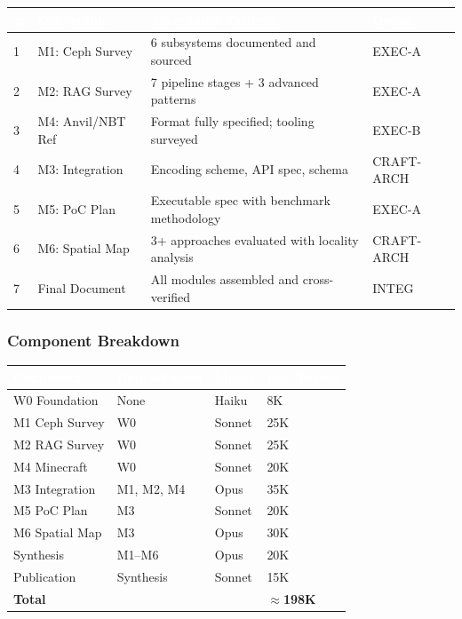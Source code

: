 \documentclass[11pt,letterpaper]{article}
\newcommand{\tableheader}[1]{\textbf{\sffamily\textcolor{white}{#1}}}
\begin{document}
\begin{center}
\begin{tabularx}{\textwidth}{C{0.5cm}L{3cm}L{4cm}X}
\toprule
{}
\tableheader{\#} & \tableheader{Deliverable} & \tableheader{Acceptance Criteria} & \tableheader{Owner} \\
 & M1: Ceph Survey & 6 subsystems documented and sourced & EXEC-A \\
2 & M2: RAG Survey & 7 pipeline stages + 3 advanced patterns & EXEC-A \\
3 & M4: Anvil/NBT Ref & Format fully specified; tooling surveyed & EXEC-B \\
4 & M3: Integration & Encoding scheme, API spec, schema & CRAFT-ARCH \\
5 & M5: PoC Plan & Executable spec with benchmark methodology & EXEC-A \\
6 & M6: Spatial Map & 3+ approaches evaluated with locality analysis & CRAFT-ARCH \\
7 & Final Document & All modules assembled and cross-verified & INTEG \\
\bottomrule
\end{tabularx}
\end{center}

\subsubsection{Component Breakdown}

\begin{center}
\begin{tabularx}{\textwidth}{L{2.5cm}L{3cm}L{2cm}C{2cm}}
\toprule
{}
\tableheader{Component} & \tableheader{Dependencies} & \tableheader{Model} & \tableheader{Est. Tokens} \\
\midrule
W0 Foundation & None & Haiku & 8K \\
M1 Ceph Survey & W0 & Sonnet & 25K \\
M2 RAG Survey & W0 & Sonnet & 25K \\
M4 Minecraft & W0 & Sonnet & 20K \\
M3 Integration & M1, M2, M4 & Opus & 35K \\
M5 PoC Plan & M3 & Sonnet & 20K \\
M6 Spatial Map & M3 & Opus & 30K \\
Synthesis & M1--M6 & Opus & 20K \\
Publication & Synthesis & Sonnet & 15K \\
\midrule
\textbf{Total} & & & \textbf{$\approx$198K} \\
\bottomrule
\end{tabularx}
\end{center}
\end{document}
